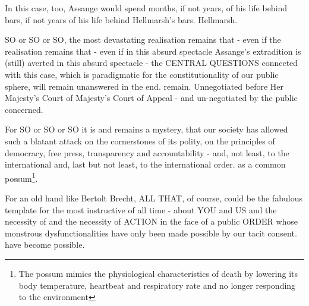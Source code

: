 \begin{multicols}{2}
In this case, too, Assange would spend months, if not years, of his life behind bars,
if not years of his life behind Hellmarsh's bars.
Hellmarsh.

SO or SO or SO, the most devastating realisation remains that - even if the
realisation remains that - even if in this absurd spectacle
Assange's extradition is (still) averted in this absurd spectacle - the CENTRAL QUESTIONS connected with this case, which is paradigmatic for the constitutionality of our public sphere, will remain unanswered in the end.
remain. Unnegotiated before Her Majesty's Court of
Majesty's Court of Appeal - and un-negotiated by the public concerned.

For SO or SO or SO it is and remains a mystery,
that our society has allowed such a blatant attack
on the cornerstones of its polity, on the principles of democracy, free press, transparency
and accountability - and, not least, to the international
and, last but not least, to the international order.
as a common possum\footnote[24]{The possum mimics the physiological characteristics of death by lowering its body temperature, heartbeat and respiratory rate and no longer responding to the environment}.

For an old hand like Bertolt Brecht, ALL
THAT, of course, could be the fabulous template for the most instructive
of all time - about YOU and US and the necessity of
and the necessity of ACTION in the face of a public ORDER whose monstrous dysfunctionalities have only been made possible by our tacit consent.
have become possible.




\end{multicols}
